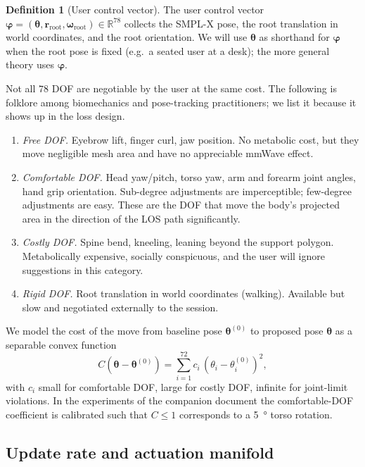 \documentclass[11pt,a4paper]{article}
\theoremstyle{definition}
\newtheorem{definition}[definition]{Definition}
\newcommand{\rr}{\mathbf{r}}
\newcommand{\Reals}{\mathbb{R}}
\newcommand{\thetab}{\bm{\theta}}
\begin{document}
\begin{definition}[User control vector]\label{def:phi}
The user control vector
$\bm\varphi=(\thetab,\rr_{\mathrm{root}},\bm\omega_{\mathrm{root}})
\in\Reals^{78}$
collects the SMPL-X pose, the root translation in world coordinates,
and the root orientation.  We will use $\thetab$ as shorthand for
$\bm\varphi$ when the root pose is fixed (e.g.\ a seated user at a
desk); the more general theory uses $\bm\varphi$.
\end{definition}

Not all $78$ DOF are negotiable by the user at the same cost.  The
following is folklore among biomechanics and pose-tracking
practitioners; we list it because it shows up in the loss design.

\begin{enumerate}[leftmargin=1.6em,itemsep=2pt]
\item \emph{Free DOF.}  Eyebrow lift, finger curl, jaw position.  No
metabolic cost, but they move negligible mesh area and have no
appreciable mmWave effect.
\item \emph{Comfortable DOF.}  Head yaw/pitch, torso yaw, arm and
forearm joint angles, hand grip orientation.  Sub-degree adjustments
are imperceptible; few-degree adjustments are easy.  These are the
DOF that move the body's projected area in the direction of the
LOS path significantly.
\item \emph{Costly DOF.}  Spine bend, kneeling, leaning beyond the
support polygon.  Metabolically expensive, socially conspicuous,
and the user will ignore suggestions in this category.
\item \emph{Rigid DOF.}  Root translation in world coordinates
(walking).  Available but slow and negotiated externally to the
session.
\end{enumerate}

We model the cost of the move from baseline pose $\thetab^{(0)}$ to
proposed pose $\thetab$ as a separable convex function
\begin{equation}\label{eq:movement-cost}
  C(\thetab-\thetab^{(0)})
  = \sum_{i=1}^{72}c_i\,(\theta_i-\theta_i^{(0)})^2,
\end{equation}
with $c_i$ small for comfortable DOF, large for costly DOF, infinite
for joint-limit violations.  In the experiments of the companion
document the comfortable-DOF coefficient is calibrated such that
$C\le 1$ corresponds to a \SI{5}{\degree} torso rotation.

\subsection{Update rate and actuation manifold}
\end{document}
